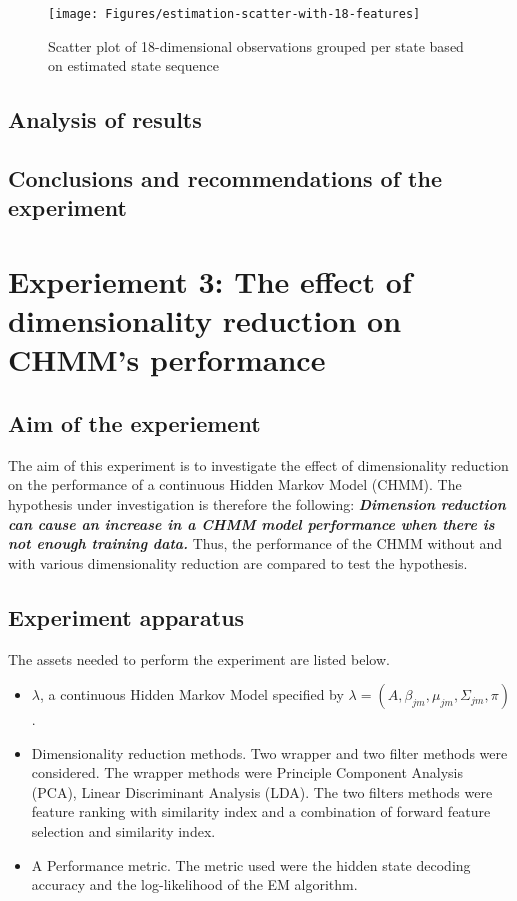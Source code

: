 \begin{figure}[ht!]
	\texttt{[image: Figures/estimation-scatter-with-18-features]}
	\caption{Scatter plot of 18-dimensional observations grouped per state based on estimated state sequence}
	\label{fig:es-18dim}
\end{figure}

\subsection{Analysis of results}

\subsection{Conclusions and recommendations of the experiment}

\section{Experiement 3: The effect of dimensionality reduction on CHMM's performance}  \label{exp:dim}

\subsection{Aim of the experiement}
The aim of this experiment is to investigate the effect of dimensionality reduction on the performance of a continuous Hidden Markov Model (CHMM).
The hypothesis under investigation is therefore the following:
\textbf{\textit{Dimension reduction can cause an increase in a CHMM model performance when there is not enough training data.}}
Thus, the performance of the CHMM without and with various dimensionality reduction are compared to test the hypothesis.

\subsection{Experiment apparatus}
The assets needed to perform the experiment are listed below.
\begin{itemize}
	\item \(\lambda\), a continuous Hidden Markov Model specified by \(\lambda = (A, \beta_{jm}, \mu_{jm}, \Sigma_{jm}, \pi)\).
	\item Dimensionality reduction methods. Two wrapper and two filter methods were considered. The wrapper methods were Principle Component Analysis (PCA), Linear Discriminant Analysis (LDA). The two filters methods were feature ranking with similarity index %
	and a combination of forward feature selection and similarity index.
	\item A Performance metric. The metric used were the hidden state decoding accuracy and the log-likelihood of the EM algorithm.
\end{itemize}

